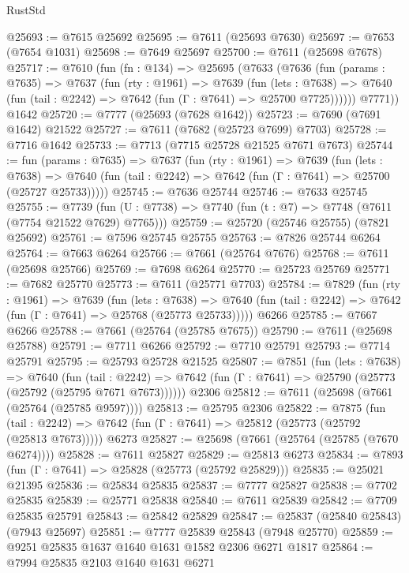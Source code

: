 \begin{lexlean}{RustStd}
\begin{coremodule}
{\begin{coremodule}
{{{{{{{{{{{{{{{{{{{{{{{{{{{{{{{{{{@25693 := @7615 @25692
@25695 := @7611 (@25693 @7630)
@25697 := @7653 (@7654 @1031)
@25698 := @7649 @25697
@25700 := @7611 (@25698 @7678)
@25717 := @7610
    (fun (fn : @134) =>
    @25695
      (@7633
        (@7636
          (fun (params : @7635) =>
          @7637
            (fun (rty : @1961) =>
            @7639
              (fun (lets : @7638) =>
              @7640 (fun (tail : @2242) => @7642 (fun (Γ : @7641) => @25700 @7725))))))
        @7771))
    @1642
@25720 := @7777 (@25693 (@7628 @1642))
@25723 := @7690 (@7691 @1642) @21522
@25727 := @7611 (@7682 (@25723 @7699) @7703)
@25728 := @7716 @1642
@25733 := @7713 (@7715 @25728 @21525 @7671 @7673)
@25744 := fun (params : @7635) =>
  @7637
    (fun (rty : @1961) =>
    @7639
      (fun (lets : @7638) =>
      @7640 (fun (tail : @2242) => @7642 (fun (Γ : @7641) => @25700 (@25727 @25733)))))
@25745 := @7636 @25744
@25746 := @7633 @25745
@25755 := @7739
    (fun (U : @7738) => @7740 (fun (t : @7) => @7748 (@7611 (@7754 @21522 @7629) @7765)))
@25759 := @25720 (@25746 @25755) (@7821 @25692)
@25761 := @7596 @25745 @25755
@25763 := @7826 @25744 @6264
@25764 := @7663 @6264
@25766 := @7661 (@25764 @7676)
@25768 := @7611 (@25698 @25766)
@25769 := @7698 @6264
@25770 := @25723 @25769
@25771 := @7682 @25770
@25773 := @7611 (@25771 @7703)
@25784 := @7829
    (fun (rty : @1961) =>
    @7639
      (fun (lets : @7638) =>
      @7640 (fun (tail : @2242) => @7642 (fun (Γ : @7641) => @25768 (@25773 @25733)))))
    @6266
@25785 := @7667 @6266
@25788 := @7661 (@25764 (@25785 @7675))
@25790 := @7611 (@25698 @25788)
@25791 := @7711 @6266
@25792 := @7710 @25791
@25793 := @7714 @25791
@25795 := @25793 @25728 @21525
@25807 := @7851
    (fun (lets : @7638) =>
    @7640
      (fun (tail : @2242) =>
      @7642 (fun (Γ : @7641) => @25790 (@25773 (@25792 (@25795 @7671 @7673))))))
    @2306
@25812 := @7611 (@25698 (@7661 (@25764 (@25785 @9597))))
@25813 := @25795 @2306
@25822 := @7875
    (fun (tail : @2242) => @7642 (fun (Γ : @7641) => @25812 (@25773 (@25792 (@25813 @7673)))))
    @6273
@25827 := @25698 (@7661 (@25764 (@25785 (@7670 @6274))))
@25828 := @7611 @25827
@25829 := @25813 @6273
@25834 := @7893 (fun (Γ : @7641) => @25828 (@25773 (@25792 @25829)))
@25835 := @25021 @21395
@25836 := @25834 @25835
@25837 := @7777 @25827
@25838 := @7702 @25835
@25839 := @25771 @25838
@25840 := @7611 @25839
@25842 := @7709 @25835 @25791
@25843 := @25842 @25829
@25847 := @25837 (@25840 @25843) (@7943 @25697)
@25851 := @7777 @25839 @25843 (@7948 @25770)
@25859 := @9251 @25835 @1637 @1640 @1631 @1582 @2306 @6271 @1817
@25864 := @7994 @25835 @2103 @1640 @1631 @6271
}}}}}}}}}}}}}}}}}}}}}}}}}}}}}}}}}}
\end{coremodule}}
\end{coremodule}
\end{lexlean}
